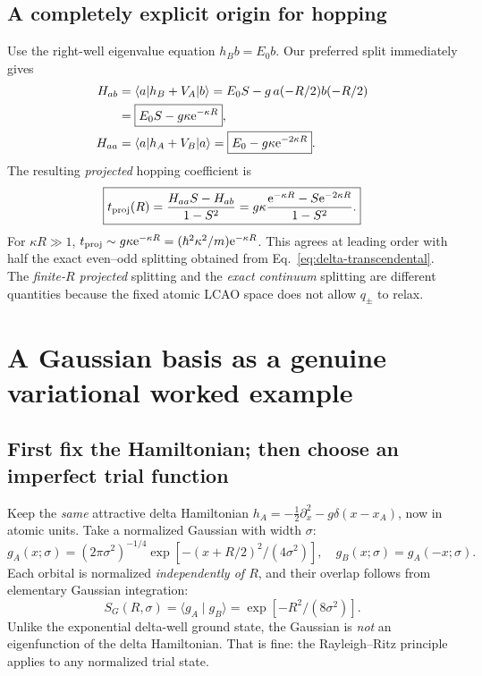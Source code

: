 \documentclass[11pt,letterpaper]{article}
\newcommand{\braket}[2]{\langle #1\mid #2\rangle}
\newcommand{\mel}[3]{\langle #1\lvert #2\rvert #3\rangle}
\newcommand{\e}{\mathrm e}
\begin{document}
\subsection{A completely explicit origin for hopping}
Use the right-well eigenvalue equation $h_Bb=E_0b$. Our preferred split immediately gives
\begin{align}
H_{ab}&=\mel a{h_B+V_A}b=E_0S-g\,a(-R/2)b(-R/2)\notag\\
&=\boxed{E_0S-g\kappa\e^{-\kappa R}},\label{eq:delta-hab}\\
H_{aa}&=\mel a{h_A+V_B}a=\boxed{E_0-g\kappa\e^{-2\kappa R}}.\label{eq:delta-haa}
\end{align}
The resulting \emph{projected} hopping coefficient is
\begin{equation}\label{eq:delta-t}
\boxed{t_{\rm proj}(R)=\frac{H_{aa}S-H_{ab}}{1-S^2}
=g\kappa\frac{\e^{-\kappa R}-S\e^{-2\kappa R}}{1-S^2}.}
\end{equation}
For $\kappa R\gg1$, $t_{\rm proj}\sim g\kappa\e^{-\kappa R}=(\hbar^2\kappa^2/m)\e^{-\kappa R}$. This agrees at leading order with half the exact even--odd splitting obtained from Eq.~\eqref{eq:delta-transcendental}. The \emph{finite-$R$ projected} splitting and the \emph{exact continuum} splitting are different quantities because the fixed atomic LCAO space does not allow $q_\pm$ to relax.

\section{A Gaussian basis as a genuine variational worked example}
\subsection{First fix the Hamiltonian; then choose an imperfect trial function}
Keep the \emph{same} attractive delta Hamiltonian $h_A=-\frac12\partial_x^2-g\delta(x-x_A)$, now in atomic units. Take a normalized Gaussian with width $\sigma$:
\begin{equation}\label{eq:gauss}
g_A(x;\sigma)=(2\pi\sigma^2)^{-1/4}\exp[-(x+R/2)^2/(4\sigma^2)],\quad
g_B(x;\sigma)=g_A(-x;\sigma).
\end{equation}
Each orbital is normalized \emph{independently of $R$}, and their overlap follows from elementary Gaussian integration:
\begin{equation}\label{eq:gauss-S}
\boxed{S_G(R,\sigma)=\braket{g_A}{g_B}=\exp[-R^2/(8\sigma^2)].}
\end{equation}
Unlike the exponential delta-well ground state, the Gaussian is \emph{not} an eigenfunction of the delta Hamiltonian. That is fine: the Rayleigh--Ritz principle applies to any normalized trial state.
\end{document}
